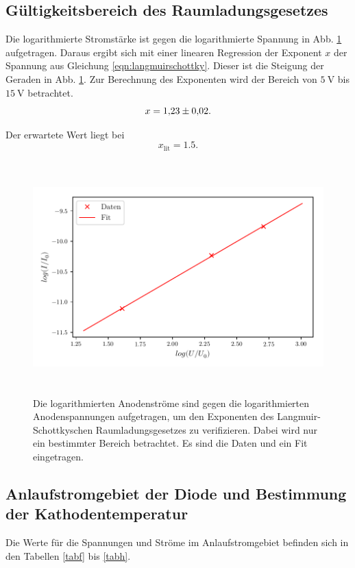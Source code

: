 \subsection{Gültigkeitsbereich des Raumladungsgesetzes}
Die logarithmierte Stromstärke ist gegen die logarithmierte
Spannung in Abb. \ref{fig:plot2} aufgetragen. %
Daraus ergibt sich mit einer linearen Regression der
Exponent $x$ der Spannung aus Gleichung \eqref{eqn:langmuirschottky}.
Dieser ist die Steigung der Geraden in Abb. \ref{fig:plot2}.
Zur Berechnung des Exponenten wird der Bereich von $\SI{5}{\volt}$ bis $\SI{15}{\volt}$ betrachtet. 
\begin{equation*}
    x = \num{1.23 \pm 0.02}.
\end{equation*}

\noindent Der erwartete Wert liegt bei 
\begin{equation*}
    x_\text{lit} = \num{1.5}.
\end{equation*}


\begin{figure}
    \centering
    \includegraphics[width=15cm, height=9cm]{build/plot2.pdf}
    \caption{Die logarithmierten Anodenströme sind gegen die logarithmierten
    Anodenspannungen aufgetragen, um den Exponenten des Langmuir-Schottkyschen
    Raumladungsgesetzes zu verifizieren. Dabei wird nur ein bestimmter
    Bereich betrachtet. Es sind die Daten und ein Fit eingetragen.}
    \label{fig:plot2}
\end{figure}


\subsection{Anlaufstromgebiet der Diode und Bestimmung der Kathodentemperatur}
Die Werte für die Spannungen und Ströme im Anlaufstromgebiet
befinden sich in den Tabellen \ref{tabf} bis \ref{tabh}.

